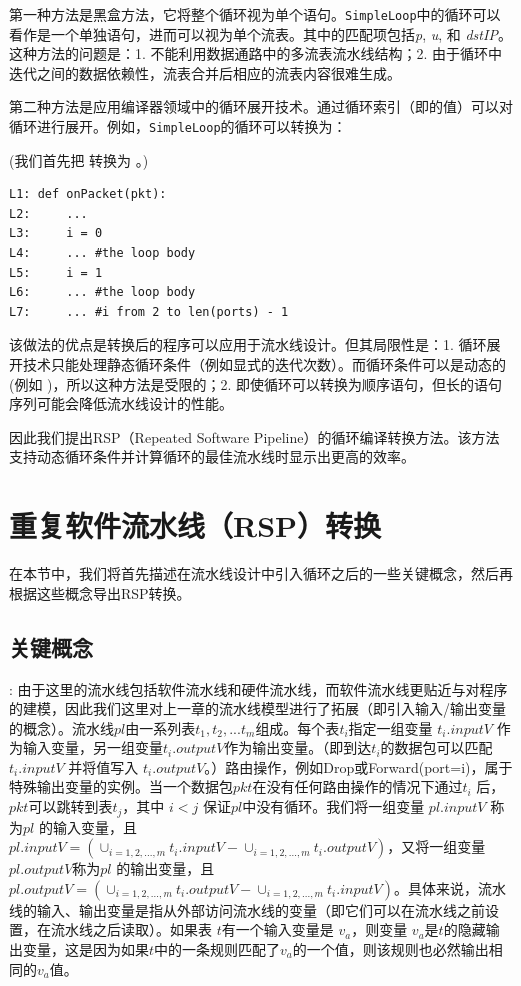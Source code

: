 第一种方法是黑盒方法，它将整个循环视为单个语句。\texttt{SimpleLoop}中的循环可以看作是一个单独语句，进而可以视为单个流表。其中的匹配项包括\emph{p}, \emph{u}, 和 \emph{dstIP}。这种方法的问题是：1. 不能利用数据通路中的多流表流水线结构；2. 由于循环中迭代之间的数据依赖性，流表合并后相应的流表内容很难生成。

第二种方法是应用编译器领域中的循环展开技术。通过循环索引（即的值）可以对循环进行展开。例如，\texttt{SimpleLoop}的循环可以转换为：

(我们首先把  转换为 。)

\begin{small}
\begin{verbatim}
L1: def onPacket(pkt):
L2:     ... 
L3:     i = 0
L4:     ... #the loop body
L5:     i = 1
L6:     ... #the loop body
L7:     ... #i from 2 to len(ports) - 1
\end{verbatim}
\end{small}

该做法的优点是转换后的程序可以应用于流水线设计。但其局限性是：1. 循环展开技术只能处理静态循环条件（例如显式的迭代次数）。而循环条件可以是动态的(例如 )，所以这种方法是受限的；2. 即使循环可以转换为顺序语句，但长的语句序列可能会降低流水线设计的性能。

因此我们提出RSP（Repeated Software Pipeline）的循环编译转换方法。该方法支持动态循环条件并计算循环的最佳流水线时显示出更高的效率。




\section{重复软件流水线（RSP）转换}
\label{sec:model}

在本节中，我们将首先描述在流水线设计中引入循环之后的一些关键概念，然后再根据这些概念导出RSP转换。
\subsection{关键概念}
: 由于这里的流水线包括软件流水线和硬件流水线，而软件流水线更贴近与对程序的建模，因此我们这里对上一章的流水线模型进行了拓展（即引入输入/输出变量的概念）。流水线$pl$由一系列表$t_1, t_2, ... t_m$组成。每个表$t_i$指定一组变量 $t_i.inputV$ 作为输入变量，另一组变量$t_i.outputV$作为输出变量。（即到达$t_i$的数据包可以匹配$t_i.inputV$ 并将值写入 $t_i.outputV$。）路由操作，例如Drop或Forward(port=i)，属于特殊输出变量的实例。当一个数据包$pkt$在没有任何路由操作的情况下通过$t_i$ 后，$pkt$可以跳转到表$t_j$，其中 $i < j$ 保证$pl$中没有循环。我们将一组变量 $pl.inputV$ 称为$pl$ 的输入变量，且$pl.inputV = (\cup_{i = 1, 2, ..., m}t_i.inputV - \cup_{i = 1, 2, ..., m}t_i.outputV)$，又将一组变量 $pl.outputV$称为$pl$ 的输出变量，且$pl.outputV = (\cup_{i = 1, 2, ..., m}t_i.outputV - \cup_{i = 1, 2, ..., m}t_i.inputV)$。具体来说，流水线的输入、输出变量是指从外部访问流水线的变量（即它们可以在流水线之前设置，在流水线之后读取）。如果表 $t$有一个输入变量是 $v_a$，则变量 $v_a$是$t$的隐藏输出变量，这是因为如果$t$中的一条规则匹配了$v_a$的一个值，则该规则也必然输出相同的$v_a$值。 

